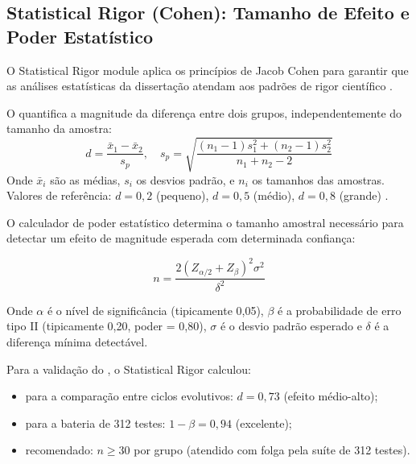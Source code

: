 \subsection{Statistical Rigor (Cohen): Tamanho de Efeito e Poder Estatístico}

O Statistical Rigor module aplica os princípios de Jacob Cohen para garantir
que as análises estatísticas da dissertação atendam aos padrões de rigor
científico \cite{cohen2018estatistica, wasserman2004all}.

\begin{definicao}
O  quantifica a magnitude da diferença entre dois grupos,
independentemente do tamanho da amostra:
\begin{equation}
d = \frac{\bar{x}_1 - \bar{x}_2}{s_p}, \quad s_p = \sqrt{\frac{(n_1-1)s_1^2 + (n_2-1)s_2^2}{n_1 + n_2 - 2}}
\end{equation}
Onde $\bar{x}_i$ são as médias, $s_i$ os desvios padrão, e $n_i$ os tamanhos
das amostras. Valores de referência: $d=0,2$ (pequeno), $d=0,5$ (médio),
$d=0,8$ (grande) \cite{cohen2018estatistica}.
\end{definicao}

O calculador de poder estatístico determina o tamanho amostral necessário para
detectar um efeito de magnitude esperada com determinada confiança:

\begin{equation}
n = \frac{2(Z_{\alpha/2} + Z_\beta)^2 \sigma^2}{\delta^2}
\end{equation}

Onde $\alpha$ é o nível de significância (tipicamente 0,05), $\beta$ é a
probabilidade de erro tipo II (tipicamente 0,20, poder = 0,80), $\sigma$ é o
desvio padrão esperado e $\delta$ é a diferença mínima detectável.

Para a validação do \opencodeeco{}, o Statistical Rigor calculou:

\begin{itemize}
\item {} para a comparação entre ciclos evolutivos: $d = 0,73$ (efeito médio-alto);
\item {} para a bateria de 312 testes: $1-\beta = 0,94$ (excelente);
\item {} recomendado: $n \geq 30$ por grupo
      (atendido com folga pela suíte de 312 testes).
\end{itemize}

